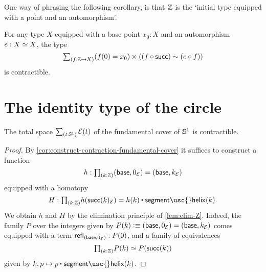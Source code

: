 One way of phrasing the following corollary, is that $\mathbb{Z}$ is the `initial type equipped with a point and an automorphism'.

\begin{cor}
  For any type $X$ equipped with a base point $x_0:X$ and an automorphism $e:\eqv{X}{X}$, the type
  \begin{equation*}
    \sm{f:\Z\to X}(f(0)=x_0)\times ((f \circ \mathsf{succ})\htpy(e\circ f))
  \end{equation*}
  is contractible.
\end{cor}



\section{The identity type of the circle}

\begin{thm}\label{thm:circle_fundamental}
The total space $\sm{t:\sphere{1}}\mathcal{E}(t)$ of the fundamental cover of $\mathbb{S}^{1}$ is contractible.
\end{thm}

\begin{proof}
  By \cref{cor:construct-contraction-fundamental-cover} it suffices to construct
  a function
  \begin{equation*}
    h : \prd{k:\Z}(\base,0_{\mathcal{E}})=(\base,k_{\mathcal{E}})
  \end{equation*}
  equipped with a homotopy
  \begin{equation*}
    H : \prd{k:\Z}h(\mathsf{succ}(k)_{\mathcal{E}})=\ct{h(k)}{\mathsf{segment\usc{}helix}(k)}.
  \end{equation*}
  We obtain $h$ and $H$ by the elimination principle of \cref{lem:elim-Z}. Indeed, the family $P$ over the integers given by $P(k)\vcentcolon\equiv (\mathsf{base},0_{\mathcal{E}})=(\mathsf{base},k_{\mathcal{E}})$ comes equipped with a term $\mathsf{refl}_{(\mathsf{base},0_{\mathcal{E}})}:P(0)$, and a family of equivalences
  \begin{equation*}
    \prd{k:\Z}P(k) \simeq P(\mathsf{succ}(k))
  \end{equation*}
  given by $k,p\mapsto \ct{p}{\mathsf{segment\usc{}helix}(k)}$. 
\end{proof}

